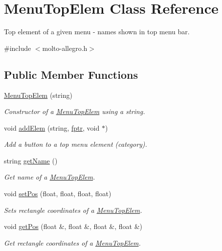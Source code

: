 \hypertarget{classMenuTopElem}{\section{Menu\-Top\-Elem Class Reference}
\label{classMenuTopElem}
}


Top element of a given menu -\/ names shown in top menu bar.  




{\ttfamily \#include $<$molto-\/allegro.\-h$>$}

\subsection*{Public Member Functions}
\begin{DoxyCompactItemize}
\item 
\hyperlink{classMenuTopElem_aa81ce746279ce1dbeea41a427f8c1e11}{Menu\-Top\-Elem} (string)
\begin{DoxyCompactList}\small\item\em Constructor of a \hyperlink{classMenuTopElem}{Menu\-Top\-Elem} using a string. \end{DoxyCompactList}\item 
void \hyperlink{classMenuTopElem_ad865f1250e1495a4d25d10ce1ea5dfa6}{add\-Elem} (string, \hyperlink{molto-allegro_8h_ab4d4c3a68df99ae93deb075950a7e396}{fptr}, void $\ast$)
\begin{DoxyCompactList}\small\item\em Add a button to a top menu element (category). \end{DoxyCompactList}\item 
\hypertarget{classMenuTopElem_a41023b203dfa45c7fa43b6f02f845170}{string \hyperlink{classMenuTopElem_a41023b203dfa45c7fa43b6f02f845170}{get\-Name} ()}\label{classMenuTopElem_a41023b203dfa45c7fa43b6f02f845170}

\begin{DoxyCompactList}\small\item\em Get name of a \hyperlink{classMenuTopElem}{Menu\-Top\-Elem}. \end{DoxyCompactList}\item 
void \hyperlink{classMenuTopElem_a5e0f820addb5ab86ac65a8d6efbdf19d}{set\-Pos} (float, float, float, float)
\begin{DoxyCompactList}\small\item\em Sets rectangle coordinates of a \hyperlink{classMenuTopElem}{Menu\-Top\-Elem}. \end{DoxyCompactList}\item 
void \hyperlink{classMenuTopElem_af14c3962261595b8dd6609ea2c52836c}{get\-Pos} (float \&, float \&, float \&, float \&)
\begin{DoxyCompactList}\small\item\em Get rectangle coordinates of a \hyperlink{classMenuTopElem}{Menu\-Top\-Elem}. \end{DoxyCompactList}\end{DoxyCompactItemize}
